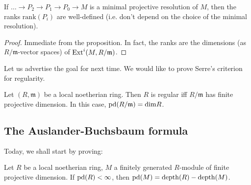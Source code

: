 \begin{corollary}
If $\dots \to P_2 \to P_1 \to P_0 \to M$ is a minimal projective
resolution of
$M$, then the ranks $\mathrm{rank}(P_i)$ are well-defined (i.e.
don't depend
on the choice of the minimal resolution).
\end{corollary}
\begin{proof}
Immediate from the proposition. In fact, the ranks are the
dimensions (as
$R/\mathfrak{m}$-vector spaces) of $\operatorname{Ext}^i(M, R/\mathfrak{m})$.
\end{proof}

Let us advertise the goal for next time. We would like to prove
Serre's
criterion for regularity.

\begin{theorem}
Let $(R, \mathfrak{m})$ be a local noetherian ring. Then $R$ is
regular iff
$R/\mathfrak{m}$ has finite projective dimension. In this case,
$\mathrm{pd}(R/\mathfrak{m}) = \mathrm{dim} R$.
\end{theorem}

\subsection{The Auslander-Buchsbaum formula}

Today, we shall start by proving:

\begin{theorem}
Let $R$ be a local noetherian ring, $M$ a finitely generated $R$-module of
finite
projective dimension. If $\mathrm{pd}(R) <
\infty$, then $\mathrm{pd}(M) = \operatorname{depth}(R) - \operatorname{depth}(M)$.
\end{theorem}

